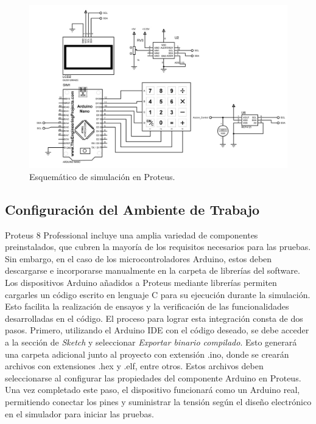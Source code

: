 \begin{figure}[H]
    \centering
    \includegraphics[scale=0.4]{./imagenes/proteus_esquema2.jpg}
    \caption{Esquemático de simulación en Proteus.}
    \label{F:esquematico_proteus}
\end{figure}

\subsection{Configuración del Ambiente de Trabajo}

Proteus 8 Professional incluye una amplia variedad de componentes preinstalados, que cubren la mayoría de los requisitos necesarios para las pruebas. Sin embargo, en el caso de los microcontroladores Arduino, estos deben descargarse e incorporarse manualmente en la carpeta de librerías del software.
Los dispositivos Arduino añadidos a Proteus mediante librerías permiten cargarles un código escrito en lenguaje C para su ejecución durante la simulación. Esto facilita la realización de ensayos y la verificación de las funcionalidades desarrolladas en el código.
El proceso para lograr esta integración consta de dos pasos. Primero, utilizando el Arduino IDE con el código deseado, se debe acceder a la sección de \textit{Sketch} y seleccionar \textit{Exportar binario compilado}. Esto generará una carpeta adicional junto al proyecto con extensión .ino, donde se crearán archivos con extensiones .hex y .elf, entre otros. Estos archivos deben seleccionarse al configurar las propiedades del componente Arduino en Proteus. Una vez completado este paso, el dispositivo funcionará como un Arduino real, permitiendo conectar los pines y suministrar la tensión según el diseño electrónico en el simulador para iniciar las pruebas.

